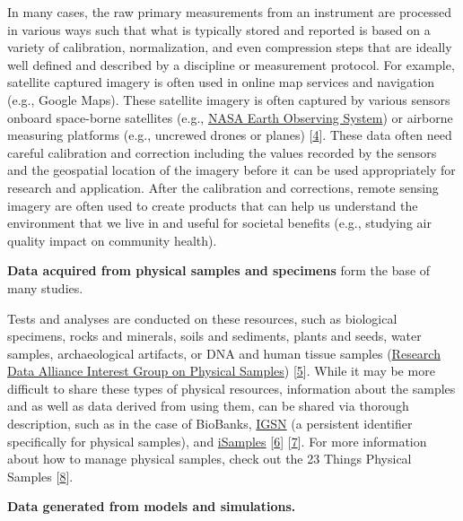 \documentclass[
  letterpaper,
  DIV=11,
  numbers=noendperiod]{scrreport}
\begin{document}
In many cases, the raw primary measurements from an instrument are
processed in various ways such that what is typically stored and
reported is based on a variety of calibration, normalization, and even
compression steps that are ideally well defined and described by a
discipline or measurement protocol. For example, satellite captured
imagery is often used in online map services and navigation (e.g.,
Google Maps). These satellite imagery is often captured by various
sensors onboard space-borne satellites (e.g.,
\href{https://eospso.gsfc.nasa.gov}{NASA Earth Observing System}) or
airborne measuring platforms (e.g., uncrewed drones or planes)
{[}\href{https://eospso.gsfc.nasa.gov}{4}{]}. These data often need
careful calibration and correction including the values recorded by the
sensors and the geospatial location of the imagery before it can be used
appropriately for research and application. After the calibration and
corrections, remote sensing imagery are often used to create products
that can help us understand the environment that we live in and useful
for societal benefits (e.g., studying air quality impact on community
health).

\textbf{Data acquired from physical samples and specimens} form the base
of many studies.

Tests and analyses are conducted on these resources, such as biological
specimens, rocks and minerals, soils and sediments, plants and seeds,
water samples, archaeological artifacts, or DNA and human tissue samples
(\href{https://www.rd-alliance.org/groups/physical-samples-and-collections-research-data-ecosystem-ig}{Research
Data Alliance Interest Group on Physical Samples})
{[}\href{https://www.rd-alliance.org/groups/physical-samples-and-collections-research-data-ecosystem-ig}{5}{]}.
While it may be more difficult to share these types of physical
resources, information about the samples and as well as data derived
from using them, can be shared via thorough description, such as in the
case of BioBanks, \href{https://www.igsn.org/}{IGSN} (a persistent
identifier specifically for physical samples), and
\href{https://isamplesorg.github.io/home/}{iSamples}
{[}\href{https://www.igsn.org/}{6}{]}
{[}\href{https://isamplesorg.github.io/home/}{7}{]}. For more
information about how to manage physical samples, check out the 23
Things Physical Samples
{[}\href{https://zenodo.org/record/6818076\#.YtgQhITMK3B}{8}{]}.

\textbf{Data generated from models and simulations.}
\end{document}
